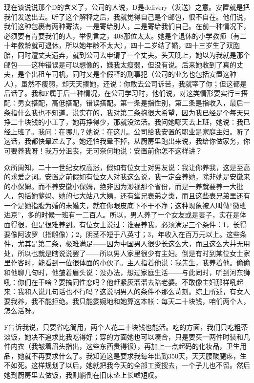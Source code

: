 现在该说说那个D的含义了，公司的人说，D是delivery（发送）之意。安置就是把我们发送出去。听了这个解释之后，我就觉得自己是个邮包，很不自在。他们说，我们这种包裹有两种寄法，一是寄给别人，二是寄给我们自己。在前一种情况下，必须要有肯要我们的人，举例言之，408那位太太。她是个退休的小学教师（有二十年教龄就可退休，所以她年龄不太大），四十二岁结了婚，四十三岁生了双胞胎，同时遭丈夫遗弃，就到公司去申请了一个丈夫。头天晚上，她以为我就是那个邮包——这种错误是可以想像的，嫌我太瘦弱，但没有说。后来她收到了真的丈夫，是个出租车司机，同时又是个假释的刑事犯（公司的业务也包括安置这种人），虽然不瘦弱，却天天揍她，还说：你敢去公司诉苦，我就宰了你；但这都是后话了。我和F属于后一种情况，在公司学习时，他们说，对这类情形要实行三搭配：男女搭配，高低搭配，错误搭配。第一条是指性别，第二条是指收入，最后一条指什么我也不知道。说实在的，我对第二条抱很大希望，因为我已经是个每天只挣二十块钱的小工了，她再挣得少，那就没法活。我问她哪天去上班，她说：我已经上班了。我问：在哪儿？她说：在这儿。公司给我安置的职业是家庭主妇。听了这话，我都快晕过去了。她还怕我晕不掉，从厨房里跑出来说，我给你做家务，你可要养我呀！我万分沮丧，无可奈何地说：安置前你怎不这样讲？ 

众所周知，二十一世纪女权高涨，假如有位女士对男友说：我让你养我，这是至高的求爱之词。安置之前假如有位女人对我这么说，我一定会养她，除非她是安徽来的小保姆。而不养安徽小保姆，绝非因为渺视那个省份，而是一养就要养一大批人，包括她爹妈、她的七大姑八大姨，还有堂兄表弟之类，而且这些表兄弟里还有一个是她指腹为婚的未婚夫，就在你眼皮底下不干不净；这种现象被人叫做“徽班进京”，多的时候一班有一二百人。所以，男人养了一个女友或是妻子，实在是体面得很，但是很难养到。有位女士说过：谁要养我，必须满足三个条件：1，长得要像阿波罗（指雕像）；2，阴茎不短于八英寸；3，年收入在百万元以上。这些条件，尤其是第二条，极难满足——因为中国男人很少长这么大，而且这么大并无用处，所以也就是瞎说说罢了——所以男人家里很少有主妇。倒是有时到某位女士家里作客时，能看到一位很体面的小伙子。主人指着他说：我先生，我养着他。偷偷和他聊几句时，他皱着眉头说：没办法，想过家庭生活——与此同时，听到河东狮吼：你们在干啥？要搞同性恋吗？他赶紧灰溜溜去陪老婆。不敢像主妇那样吼起来：我和人说几句话也不行吗？这说明男人的条件不那么苛刻。综上所述，有女人要我养，我不能拒绝。我只能委婉地和她算这本帐：每天二十块钱，咱们两个人，怎么活呀。 

F告诉我说，只要省吃简用，两个人花二十块钱也能活。吃的方面，我们只吃粗茶淡饭，她决不追求比我吃得好；穿的方面她也可以凑合，只是要买一两件时装和几件内衣（我皱着眉头指出，这些东西贵得很），再加上一点起码的化妆品，卫生用品，她就不再要求什么了。我知道这是要求我每年出勤350天，天天腰酸腿疼，生不如死。这样规划了以后，她就把我今天的全部工资搜去，一个子儿也不留。然后她到厨房里去做饭，我则躺倒在旧床垫上长嘘短叹。 

